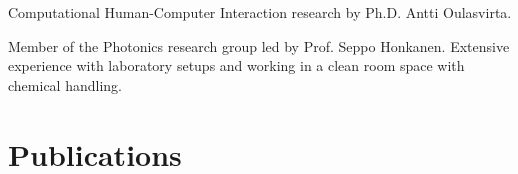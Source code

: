 \documentclass[]{deedy-resume-openfont}
\begin{document}
\begin{minipage}[t]{0.66\textwidth}
\begin{tightemize}
\item Computational Human-Computer Interaction research by Ph.D. Antti Oulasvirta.
\end{tightemize}

\begin{tightemize}
\item Member of the Photonics research group led by Prof. Seppo Honkanen. Extensive experience with laboratory setups and working in a clean room space with chemical handling.
\end{tightemize}


\section{Publications} 
\renewcommand\refname{\vskip -0.8cm} %


\nocite{*}

\end{minipage} 
\end{document}
